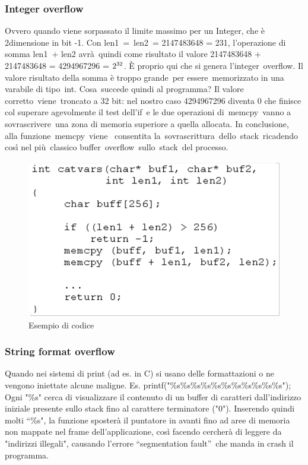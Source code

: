 \documentclass[8pt]{extarticle}
\begin{document}
\subsubsection{Integer overflow}
Ovvero quando viene sorpassato il limite massimo per un Integer, che è 2dimensione in bit -1. 
Con len1 = len2 = 2147483648 = 231, l’operazione di somma len1 + len2 avrà quindi come risultato il 
valore 2147483648 + 2147483648 = 4294967296 = $2\textsuperscript{32}$. È proprio qui che si genera l’integer overflow. 
Il valore risultato della somma è troppo grande per essere memorizzato in una varabile di tipo int. 
Cosa succede quindi al programma? Il valore corretto viene troncato a 32 bit: nel nostro caso 4294967296 
diventa 0 che finisce col superare agevolmente il test dell’if e le due operazioni di memcpy vanno a 
sovrascrivere una zona di memoria superiore a quella allocata. In conclusione, alla funzione memcpy viene 
consentita la sovrascrittura dello stack ricadendo così nel più classico buffer overflow sullo stack del processo.
\begin{figure}[H]
    \center
    \includegraphics[scale=0.2]{images/BO3.png}
    \caption{Esempio di codice}\label{fig:1}
\end{figure}
\subsubsection{String format overflow}
Quando nei sistemi di print (ad es. in C) si usano delle formattazioni o ne vengono iniettate alcune maligne. 
Es. printf("\%s\%s\%s\%s\%s\%s\%s\%s\%s\%s\%s"); Ogni "\%s" cerca di visualizzare il contenuto di un buffer di 
caratteri dall'indirizzo iniziale presente sullo stack fino al carattere terminatore ("0"). Inserendo quindi molti 
“\%s", la funzione sposterà il puntatore in avanti fino ad aree di memoria non mappate nel frame dell'applicazione, 
così facendo cercherà di leggere da "indirizzi illegali", causando l'errore “segmentation fault” che manda in 
crash il programma.
\end{document}
